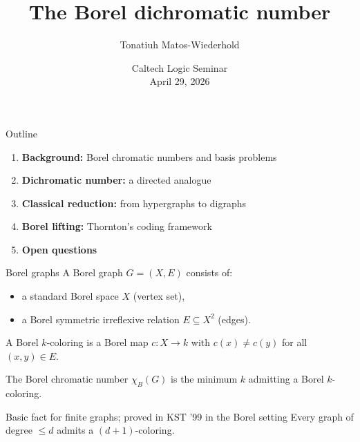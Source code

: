 \documentclass[aspectratio=169, 12pt]{beamer}
\title{The Borel dichromatic number}
\author{Tonatiuh Matos-Wiederhold}
\institute{University of Toronto}
\date{Caltech Logic Seminar \\ April 29, 2026}
\begin{document}
\begin{frame}
\titlepage
\end{frame}


\begin{frame}{Outline}
\begin{enumerate}
	\item \textbf{Background:} Borel chromatic numbers and basis problems
	\item \textbf{Dichromatic number:} a directed analogue
	\item \textbf{Classical reduction:} from hypergraphs to digraphs
	\item \textbf{Borel lifting:} Thornton's coding framework
	\item \textbf{Open questions}
\end{enumerate}
\end{frame}


\begin{frame}{Borel graphs}
A \alert{Borel graph} $G = (X, E)$ consists of:
\begin{itemize}
	\item a standard Borel space $X$ (vertex set),
	\item a Borel symmetric irreflexive relation $E \subseteq X^2$ (edges).
\end{itemize}

\medskip

A \alert{Borel $k$-coloring} is a Borel map $c\colon X \to k$ with $c(x) \neq c(y)$ for all $(x,y) \in E$.

\medskip

The \alert{Borel chromatic number} $\chi_B(G)$ is the minimum $k$ admitting a Borel $k$-coloring.

\medskip
\begin{block}{Basic fact for finite graphs; proved in KST '99 in the Borel setting}
Every graph of degree $\leq d$ admits a $(d+1)$-coloring.
\end{block}
\end{frame}

\end{document}

